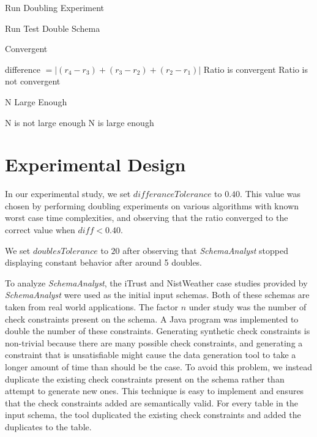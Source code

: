 \documentclass[smallextended]{svjour3}       %
\begin{document}
\begin{algorithm}[t]
    \caption{Run Doubling Experiment}
    \begin{algorithmic}
        \STATE Run Test
        \ENDFOR
        \STATE Double Schema
        \ENDWHILE
    \end{algorithmic}
    \label{alg:main}
  \end{algorithm}

 \begin{algorithm}[t]
    \caption{Convergent}
    \begin{algorithmic}
      \STATE difference $= |(r_4 - r_3) + (r_3 -r_2) + (r_2 - r_1)|$
      \RETURN Ratio is convergent
      \ELSE
      \RETURN Ratio is not convergent
      \ENDIF
    \end{algorithmic}
    \label{alg:convergence}
  \end{algorithm}

 \begin{algorithm}[t]
    \caption{N Large Enough}
    \begin{algorithmic}
      \RETURN N is not large enough
      \ENDIF
      \ENDIF
      \RETURN N is large enough
    \end{algorithmic}
    \label{alg:tuning}
  \end{algorithm}

\section{Experimental Design}
In our experimental study, we set $\mathit{differanceTolerance}$ to
$0.40$. This value was chosen by performing doubling
experiments on various algorithms with known worst case time
complexities, and observing that the ratio converged to the correct
value when $\mathit{diff} < 0.40$.

We set $\mathit{doublesTolerance}$ to $20$ after observing that
\textit{SchemaAnalyst} stopped displaying constant behavior after around
5 doubles.

To analyze \textit{SchemaAnalyst}, the iTrust and NistWeather case
studies provided by \textit{SchemaAnalyst} were used as the initial 
input schemas.
Both of these schemas are taken from real world applications. The factor $n$
under study was the number of check constraints present on the schema.  
A Java program was
implemented to double the number of these constraints. Generating
synthetic check constraints is non-trivial because there are many
possible check constraints, and generating a constraint that is
unsatisfiable might cause the data generation tool to take a longer
amount of time than should be the case. To avoid this problem, we
instead duplicate the existing check constraints present on the schema
rather than attempt to generate new ones. This technique is easy
to implement and ensures that the check constraints added are
semantically valid.  For every table in the input schema, the tool 
duplicated the existing check constraints and added the duplicates 
to the table.  
\end{document}
